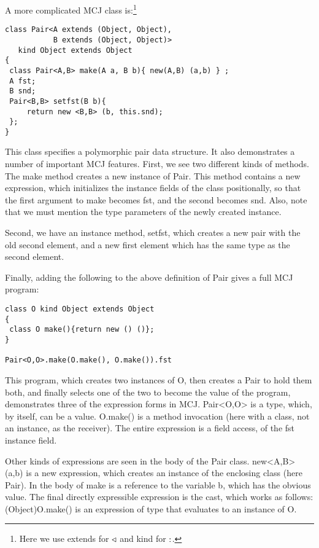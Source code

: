 \documentclass{acmconfbig}
\begin{document}
A more complicated MCJ class is:\footnote{Here we use {\txt extends}
for $\triangleleft$ and {\txt kind} for $:$.}

\begin{verbatim}
class Pair<A extends (Object, Object),
           B extends (Object, Object)>
   kind Object extends Object
{
 class Pair<A,B> make(A a, B b){ new(A,B) (a,b) } ;
 A fst;
 B snd;
 Pair<B,B> setfst(B b){
     return new <B,B> (b, this.snd);
 };
}
\end{verbatim}

This class specifies a polymorphic pair data structure.  It also
demonstrates a number of important MCJ features.  First, we see two
different kinds of methods.  The {\txt make} method creates a new
instance of {\txt Pair}.  This method contains a {\txt new}
expression, which initializes the instance fields of the class
positionally, so that the first argument to {\txt make} becomes {\txt
 fst}, and the second becomes {\txt snd}.  Also, note that we must
mention the type parameters of the newly created instance.

Second, we have an instance method, {\txt setfst}, which creates a new
pair with the old second element, and a new first element which has
the same type as the second element.

Finally, adding the following to the above definition of {\txt Pair}
gives a full MCJ program:

\begin{verbatim}
class O kind Object extends Object
{
 class O make(){return new () ()};
}

Pair<O,O>.make(O.make(), O.make()).fst
\end{verbatim}

This program, which creates two instances of {\txt O}, then creates
a {\txt Pair} to hold them both, and finally selects one of the two to
become the value of the program, demonstrates three of the expression
forms in MCJ.  {\txt Pair<O,O>} is a type, which, by itself, can
be a value.  {\txt O.make()} is a method invocation (here with a
class, not an instance, as the receiver).  The entire expression is a
field access, of the {\txt fst} instance field.

Other kinds of expressions are seen in the body of the {\txt Pair}
class.  {\txt new<A,B> (a,b)} is a new expression, which creates an
instance of the enclosing class (here {\txt Pair}).  In the body of
{\txt make} is a reference to the variable {\txt b}, which has the
obvious value.  The final directly expressible expression is the cast,
which works as follows: {\txt (Object)O.make()} is an expression of
type \Object that evaluates to an instance of {\txt O}.
\end{document}
